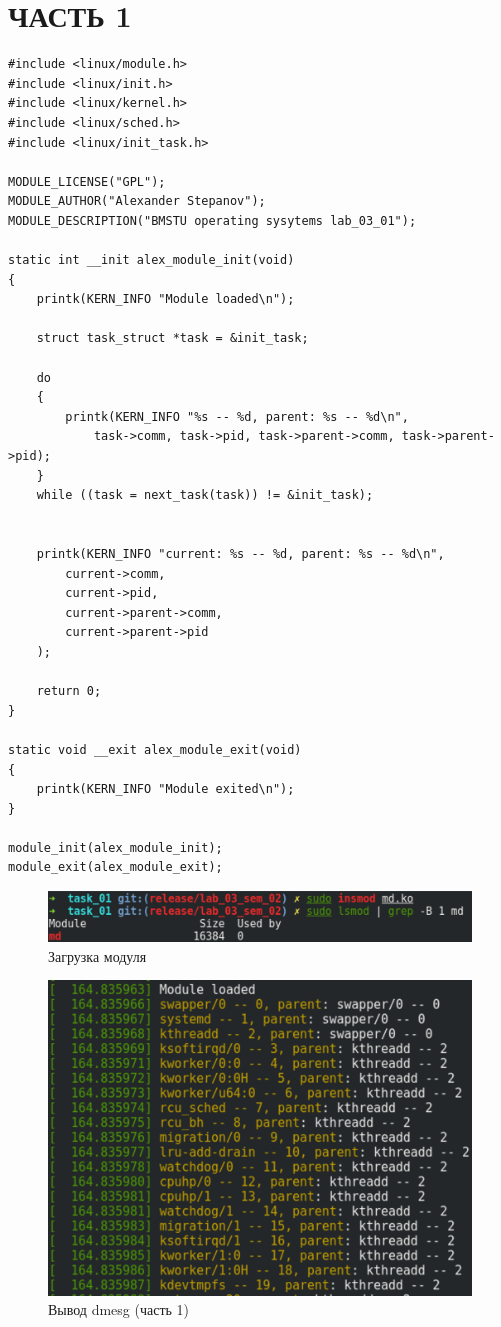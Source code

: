 \section{ЧАСТЬ 1}

\begin{lstlisting}[caption=Текст программы]
#include <linux/module.h>
#include <linux/init.h>
#include <linux/kernel.h>
#include <linux/sched.h>
#include <linux/init_task.h>

MODULE_LICENSE("GPL");
MODULE_AUTHOR("Alexander Stepanov");
MODULE_DESCRIPTION("BMSTU operating sysytems lab_03_01");

static int __init alex_module_init(void)
{
    printk(KERN_INFO "Module loaded\n");

    struct task_struct *task = &init_task;

    do
    {
        printk(KERN_INFO "%s -- %d, parent: %s -- %d\n",
            task->comm, task->pid, task->parent->comm, task->parent->pid);
    }
    while ((task = next_task(task)) != &init_task);

 
    printk(KERN_INFO "current: %s -- %d, parent: %s -- %d\n",
        current->comm,
        current->pid,
        current->parent->comm,
        current->parent->pid
    );

    return 0;
}

static void __exit alex_module_exit(void)
{
    printk(KERN_INFO "Module exited\n");
}

module_init(alex_module_init);
module_exit(alex_module_exit);
\end{lstlisting}

\begin{figure}[H]
    \centering
    \includegraphics[scale=0.8]{img/part_01/insmod.png}
    \caption{Загрузка модуля}
\end{figure}

\begin{figure}[H]
    \centering
    \includegraphics[scale=1]{img/part_01/dmesg_01.png}
    \caption{Вывод dmesg (часть 1)}
\end{figure}

